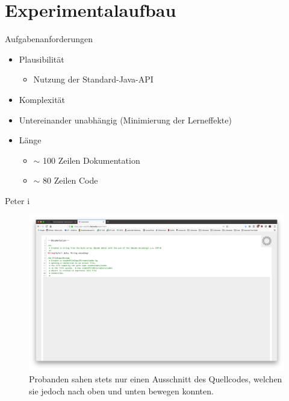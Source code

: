 \documentclass[10pt]{beamer}
\begin{document}
\section{Experimentalaufbau}

	\begin{frame}{Aufgabenanforderungen}
		\begin{itemize}
			\item Plausibilität\\
				\begin{itemize}
					\item Nutzung der Standard-Java-API
				\end{itemize}
			\vspace{\baselineskip}
			\item Komplexität\\
			\vspace{\baselineskip}
			\item Untereinander unabhängig (Minimierung der Lerneffekte)\\
            \vspace{\baselineskip}
			\item Länge
			\begin{itemize}
				\item $\sim$ 100 Zeilen Dokumentation
				\item $\sim$ 80 Zeilen Code
			\end{itemize}
		\end{itemize}
	\end{frame}

	\begin{frame}{Peter  i}
		\begin{figure}
			\includegraphics[scale=0.15]{graphics/peter_window.png}
			\caption{\label{fig:peter_window.png} Probanden sahen stets nur einen Ausschnitt des Quellcodes, welchen sie jedoch nach oben und unten bewegen konnten.}
		\end{figure}
	\end{frame}
\end{document}
